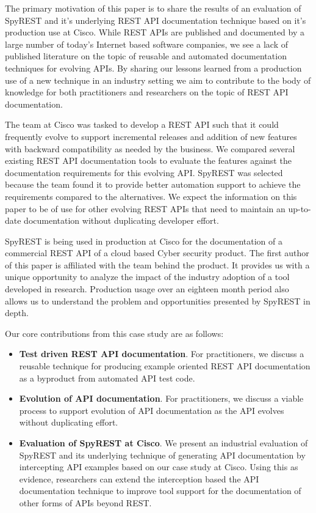 \documentclass[10pt, conference]{IEEEtran}
\begin{document}
The primary motivation of this paper is to share the results of an evaluation of SpyREST and it's underlying REST API documentation technique based on it's production use at Cisco. While REST APIs are published and documented by a large number of today's Internet based software companies, we see a lack of published literature on the topic of reusable and automated documentation techniques for evolving APIs. By sharing our lessons learned from a production use of a new technique in an industry setting we aim to contribute to the body of knowledge for both practitioners and researchers on the topic of REST API documentation.

The team at Cisco was tasked to develop a REST API such that it could frequently evolve to support incremental releases and addition of new features with backward compatibility as needed by the business. We compared several existing REST API documentation tools to evaluate the features against the documentation requirements for this evolving API. SpyREST was selected because the team found it to provide better automation support to achieve the requirements compared to the alternatives. We expect the information on this paper to be of use for other evolving REST APIs that need to maintain an up-to-date documentation without duplicating developer effort.

SpyREST is being used in production at Cisco for the documentation of a commercial REST API of a cloud based Cyber security product. The first author of this paper is affiliated with the team behind the product. It provides us with a unique opportunity to analyze the impact of the industry adoption of a tool developed in research. Production usage over an eighteen month period also allows us to understand the problem and opportunities presented by SpyREST in depth.

Our core contributions from this case study are as follows:

\begin{itemize}
  \item \textbf{Test driven REST API documentation}. For practitioners, we discuss a reusable technique for producing example oriented REST API documentation as a byproduct from automated API test code.
  \item \textbf{Evolution of API documentation}. For practitioners, we discuss a viable process to support evolution of API documentation as the API evolves without duplicating effort.
  \item \textbf{Evaluation of SpyREST at Cisco}. We present an industrial evaluation of SpyREST and its underlying technique of generating API documentation by intercepting API examples based on our case study at Cisco. Using this as evidence, researchers can extend the interception based the API documentation technique to improve tool support for the documentation of other forms of APIs beyond REST.
\end{itemize}
\end{document}
